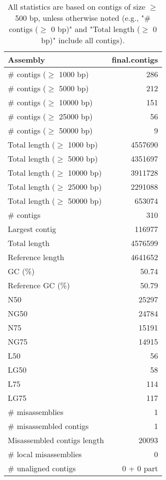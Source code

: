 \documentclass[12pt,a4paper]{article}
\begin{document}
\begin{table}[ht]
\begin{center}
\caption{All statistics are based on contigs of size $\geq$ 500 bp, unless otherwise noted (e.g., "\# contigs ($\geq$ 0 bp)" and "Total length ($\geq$ 0 bp)" include all contigs).}
\begin{tabular}{|l*{1}{|r}|}
\hline
Assembly & final.contigs \\ \hline
\# contigs ($\geq$ 1000 bp) & 286 \\ \hline
\# contigs ($\geq$ 5000 bp) & 212 \\ \hline
\# contigs ($\geq$ 10000 bp) & 151 \\ \hline
\# contigs ($\geq$ 25000 bp) & 56 \\ \hline
\# contigs ($\geq$ 50000 bp) & 9 \\ \hline
Total length ($\geq$ 1000 bp) & 4557690 \\ \hline
Total length ($\geq$ 5000 bp) & 4351697 \\ \hline
Total length ($\geq$ 10000 bp) & 3911728 \\ \hline
Total length ($\geq$ 25000 bp) & 2291088 \\ \hline
Total length ($\geq$ 50000 bp) & 653074 \\ \hline
\# contigs & 310 \\ \hline
Largest contig & 116977 \\ \hline
Total length & 4576599 \\ \hline
Reference length & 4641652 \\ \hline
GC (\%) & 50.74 \\ \hline
Reference GC (\%) & 50.79 \\ \hline
N50 & 25297 \\ \hline
NG50 & 24784 \\ \hline
N75 & 15191 \\ \hline
NG75 & 14915 \\ \hline
L50 & 56 \\ \hline
LG50 & 58 \\ \hline
L75 & 114 \\ \hline
LG75 & 117 \\ \hline
\# misassemblies & 1 \\ \hline
\# misassembled contigs & 1 \\ \hline
Misassembled contigs length & 20093 \\ \hline
\# local misassemblies & 0 \\ \hline
\# unaligned contigs & 0 + 0 part \\ \hline

\end{tabular}
\end{center}
\end{table}
\end{document}
